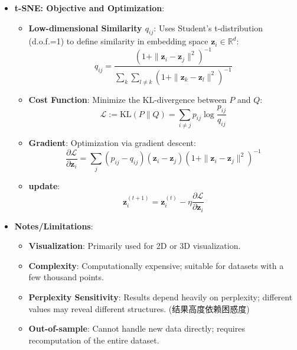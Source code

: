 \documentclass[UTF8]{ctexart}
\begin{document}
\begin{itemize}
    \newpage
    \item \textbf{t-SNE: Objective and Optimization}:
    \begin{itemize}
        \item \textbf{Low-dimensional Similarity $q_{ij}$}: Uses Student's t-distribution (d.o.f.=1) to define similarity in embedding space $\mathbf{z}_i \in \mathbb{R}^d$:
        $$q_{ij} = \frac{(1 + \|\mathbf{z}_i - \mathbf{z}_j\|^2)^{-1}}{\sum_{k} \sum_{l \neq k} (1 + \|\mathbf{z}_k - \mathbf{z}_l\|^2)^{-1}}$$
        \item \textbf{Cost Function}: Minimize the KL-divergence between $P$ and $Q$:
        $$\mathcal{L} := \text{KL}(P \| Q) = \sum_{i \neq j} p_{ij} \log \frac{p_{ij}}{q_{ij}}$$
        \item \textbf{Gradient}: Optimization via gradient descent:
        $$\frac{\partial \mathcal{L}}{\partial \mathbf{z}_i} = \sum_{j} (p_{ij} - q_{ij})(\mathbf{z}_i - \mathbf{z}_j)(1 + \|\mathbf{z}_i - \mathbf{z}_j\|^2)^{-1}$$
        \item \textbf{update}: $$\mathbf{z}_i^{(t+1)} = \mathbf{z}_i^{(t)} - \eta \frac{\partial \mathcal{L}}{\partial \mathbf{z}_i}$$
    \end{itemize}
    \item \textbf{Notes/Limitations}:
    \begin{itemize}
        \item \textbf{Visualization}: Primarily used for 2D or 3D visualization.
        \item \textbf{Complexity}: Computationally expensive; suitable for datasets with a few thousand points.
        \item \textbf{Perplexity Sensitivity}: Results depend heavily on perplexity; different values may reveal different structures.
        (结果高度依赖困惑度) 
        \item \textbf{Out-of-sample}: Cannot handle new data directly; requires recomputation of the entire dataset.
    \end{itemize}
\end{itemize}
\end{document}
